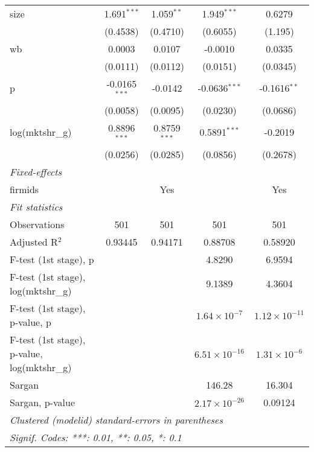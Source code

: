 \begin{tabular}{lcccc}
   size                                       & 1.691$^{***}$   & 1.059$^{**}$           & 1.949$^{***}$          & 0.6279\\   
                                              & (0.4538)        & (0.4710)               & (0.6055)               & (1.195)\\   
   wb                                         & 0.0003          & 0.0107                 & -0.0010                & 0.0335\\   
                                              & (0.0111)        & (0.0112)               & (0.0151)               & (0.0345)\\   
   p                                          & -0.0165$^{***}$ & -0.0142                & -0.0636$^{***}$        & -0.1616$^{**}$\\   
                                              & (0.0058)        & (0.0095)               & (0.0230)               & (0.0686)\\   
   log(mktshr\_g)                             & 0.8896$^{***}$  & 0.8759$^{***}$         & 0.5891$^{***}$         & -0.2019\\   
                                              & (0.0256)        & (0.0285)               & (0.0856)               & (0.2678)\\   
   \midrule
   \emph{Fixed-effects}\\
   firmids                                    &                 & Yes                    &                        & Yes\\  
   \midrule
   \emph{Fit statistics}\\
   Observations                               & 501             & 501                    & 501                    & 501\\  
   Adjusted R$^2$                             & 0.93445         & 0.94171                & 0.88708                & 0.58920\\  
   F-test (1st stage), p                      &                 &                        & 4.8290                 & 6.9594\\  
   F-test (1st stage), log(mktshr_g)          &                 &                        & 9.1389                 & 4.3604\\  
   F-test (1st stage), p-value, p             &                 &                        & $1.64\times 10^{-7}$   & $1.12\times 10^{-11}$\\   
   F-test (1st stage), p-value, log(mktshr_g) &                 &                        & $6.51\times 10^{-16}$  & $1.31\times 10^{-6}$\\   
   Sargan                                     &                 &                        & 146.28                 & 16.304\\  
   Sargan, p-value                            &                 &                        & $2.17\times 10^{-26}$  & 0.09124\\  
   \midrule \midrule
   \multicolumn{5}{l}{\emph{Clustered (modelid) standard-errors in parentheses}}\\
   \multicolumn{5}{l}{\emph{Signif. Codes: ***: 0.01, **: 0.05, *: 0.1}}\\
\end{tabular}
\par\endgroup


